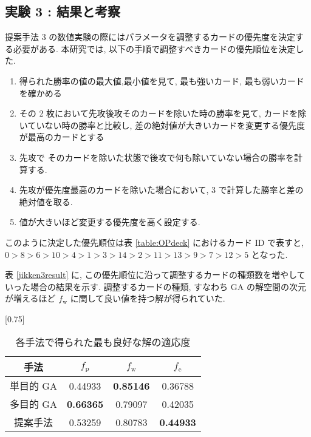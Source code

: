 \documentclass[twocolumn]{jarticle}
\begin{document}
               \subsection{実験 3 : 結果と考察}
               提案手法 3 の数値実験の際にはパラメータを調整するカードの優先度を決定する必要がある.
               本研究では, 以下の手順で調整すべきカードの優先順位を決定した. 
               \begin{enumerate}
                  \small
                  \setlength{\itemsep}{0cm} %
                 \item 得られた勝率の値の最大値,最小値を見て, 最も強いカード, 最も弱いカードを確かめる
                 \item その 2 枚において先攻後攻そのカードを除いた時の勝率を見て, カードを除いていない時の勝率と比較し, 差の絶対値が大きいカードを変更する優先度が最高のカードとする
                 \item 先攻で そのカードを除いた状態で後攻で何も除いていない場合の勝率を計算する.
                 \item 先攻が優先度最高のカードを除いた場合において, 3 で計算した勝率と差の絶対値を取る. 
                 \item 値が大きいほど変更する優先度を高く設定する.
               \end{enumerate}
               このように決定した優先順位は表 \ref{table:OPdeck} におけるカード ID で表すと, 
               $0 > 8 > 6 > 10 > 4 > 1 > 3 > 14 > 2 > 11 > 13 > 9 > 7 > 12 > 5$ となった. \par
               表 \ref{jikken3result} に, この優先順位に沿って調整するカードの種類数を増やしていった場合の結果を示す.
               調整するカードの種類, すなわち GA の解空間の次元が増えるほど $f_\mathrm{w}$ に関して良い値を持つ解が得られていた. 
                 \begin{table}[t]
                  \centering
                  \caption{各手法で得られた最も良好な解の適応度}
                  \label{res_3}
                  \vspace{-0.3cm}
                  
                  \scalebox{0.75}[0.75]{
                    \begin{tabular}{|c|c|c|c|}
                      \hline
                      手法        & $f_\mathrm{p}$ & $f_\mathrm{w}$ & $f_\mathrm{c}$ \\ \hline \hline
                      単目的 GA      & 0.44933         & \textbf{0.85146}   & 0.36788          \\ \hline
                      多目的 GA  & \textbf{0.66365}         & 0.79097   & 0.42035          \\ \hline
                      提案手法   & 0.53259              &  0.80783     & \textbf{0.44933}  \\ \hline
                      \end{tabular}
                  }
                  \vspace{-0.3cm}
                  \end{table}
\end{document}
